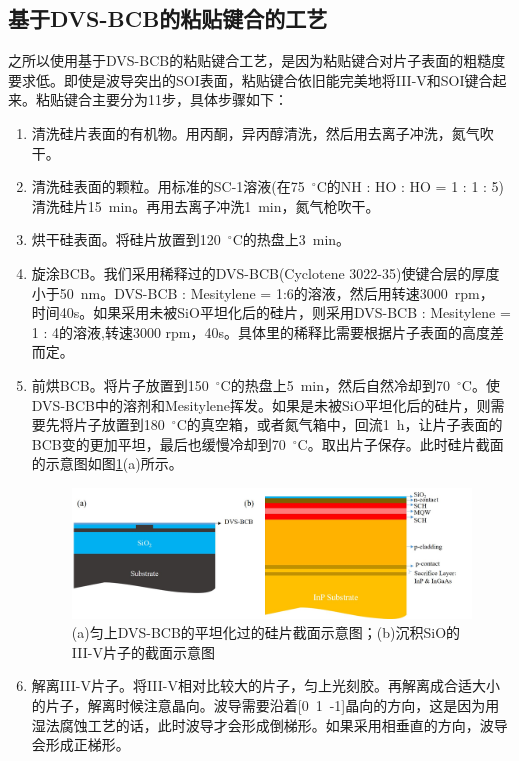 \subsection{基于DVS-BCB的粘贴键合的工艺}
之所以使用基于DVS-BCB的粘贴键合工艺，是因为粘贴键合对片子表面的粗糙度要求低。即使是波导突出的SOI表面，粘贴键合依旧能完美地将III-V和SOI键合起来。粘贴键合主要分为11步，具体步骤如下：
\begin{enumerate}[(1)]
	\item 清洗硅片表面的有机物。用丙酮，异丙醇清洗，然后用去离子冲洗，氮气吹干。
	\item 清洗硅表面的颗粒。用标准的SC-1溶液(在75~$^{\circ}$C的NH : HO : HO = 1 : 1 : 5)清洗硅片15~min。再用去离子冲洗1~min，氮气枪吹干。
	\item 烘干硅表面。将硅片放置到120~$^{\circ}$C的热盘上3~min。
	\item 旋涂BCB。我们采用稀释过的DVS-BCB(Cyclotene 3022-35)\cite{dvsbcb35}使键合层的厚度小于50~nm\cite{keyvaninia2013ultra}。DVS-BCB : Mesitylene = 1:6的溶液，然后用转速3000~rpm， 时间40s。如果采用未被SiO平坦化后的硅片，则采用DVS-BCB : Mesitylene = 1 : 4的溶液,转速3000 rpm，40s。具体里的稀释比需要根据片子表面的高度差而定。
	\item 前烘BCB。将片子放置到150~$^{\circ}$C的热盘上5~min，然后自然冷却到70~$^{\circ}$C。使DVS-BCB中的溶剂和Mesitylene挥发。如果是未被SiO平坦化后的硅片，则需要先将片子放置到180~$^{\circ}$C的真空箱，或者氮气箱中，回流1~h，让片子表面的BCB变的更加平坦，最后也缓慢冷却到70~$^{\circ}$C。取出片子保存。此时硅片截面的示意图如图\ref{chapt4_bonding_diagram1}(a)所示。
	\begin{figure}[htb]
		\centering
		\includegraphics[width=14cm]{./Pictures/chapt4_bonding_diagram1.jpg}
		\caption{(a)匀上DVS-BCB的平坦化过的硅片截面示意图；(b)沉积SiO的III-V片子的截面示意图}
		\label{chapt4_bonding_diagram1}
	\end{figure}
	\item 解离III-V片子。将III-V相对比较大的片子，匀上光刻胶。再解离成合适大小的片子，解离时候注意晶向。波导需要沿着[0~1~-1]晶向的方向，这是因为用湿法腐蚀工艺的话，此时波导才会形成倒梯形。如果采用相垂直的方向，波导会形成正梯形。

\end{enumerate}
